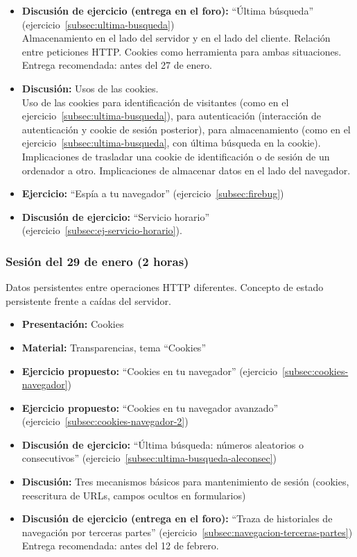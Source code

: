 \documentclass[a4paper,12pt]{article}
\begin{document}
\begin{itemize}
\item \textbf{Discusión de ejercicio (entrega en el foro):} ``Última búsqueda'' (ejercicio~\ref{subsec:ultima-busqueda}) \\
  Almacenamiento en el lado del servidor y en el lado del cliente. Relación entre peticiones HTTP. Cookies como herramienta para ambas situaciones.\\
  Entrega recomendada: antes del 27 de enero.
\item \textbf{Discusión:} Usos de las cookies. \\
  Uso de las cookies para identificación de visitantes (como en el ejercicio~\ref{subsec:ultima-busqueda}), para autenticación (interacción de autenticación y cookie de sesión posterior), para almacenamiento (como en el ejercicio~\ref{subsec:ultima-busqueda}, con última búsqueda en la cookie). Implicaciones de trasladar una cookie de identificación o de sesión de un ordenador a otro. Implicaciones de almacenar datos en el lado del navegador.
\item \textbf{Ejercicio:} ``Espía a tu navegador'' (ejercicio~\ref{subsec:firebug})
\item \textbf{Discusión de ejercicio:} ``Servicio horario'' \\
  (ejercicio~\ref{subsec:ej-servicio-horario}).
\end{itemize}


\subsubsection{Sesión del 29 de enero (2 horas)}

Datos persistentes entre operaciones HTTP diferentes. Concepto de estado persistente frente a caídas del servidor.

\begin{itemize}
\item \textbf{Presentación:} Cookies
\item \textbf{Material:} Transparencias, tema ``Cookies''
\item \textbf{Ejercicio propuesto:} ``Cookies en tu navegador'' (ejercicio~\ref{subsec:cookies-navegador}) \\
\item \textbf{Ejercicio propuesto:} ``Cookies en tu navegador avanzado'' (ejercicio~\ref{subsec:cookies-navegador-2}) \\
\item \textbf{Discusión de ejercicio:} ``Última búsqueda: números aleatorios o consecutivos'' (ejercicio~\ref{subsec:ultima-busqueda-aleconsec}) \\
\item \textbf{Discusión:} Tres mecanismos básicos para mantenimiento de sesión (cookies, reescritura de URLs, campos ocultos en formularios)
\item \textbf{Discusión de ejercicio (entrega en el foro):} ``Traza de historiales de navegación por terceras partes'' (ejercicio~\ref{subsec:navegacion-terceras-partes})  \\
  Entrega recomendada: antes del 12 de febrero.
\end{itemize}
\end{document}
